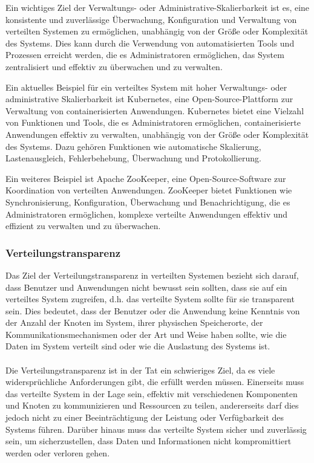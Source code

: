 \begin{itemize}
Ein wichtiges Ziel der Verwaltungs- oder Administrative-Skalierbarkeit ist es, eine konsistente und zuverlässige Überwachung, Konfiguration und Verwaltung von verteilten Systemen zu ermöglichen, unabhängig von der Größe oder Komplexität des Systems. Dies kann durch die Verwendung von automatisierten Tools und Prozessen erreicht werden, die es Administratoren ermöglichen, das System zentralisiert und effektiv zu überwachen und zu verwalten.

Ein aktuelles Beispiel für ein verteiltes System mit hoher Verwaltungs- oder administrative Skalierbarkeit ist Kubernetes, eine Open-Source-Plattform zur Verwaltung von containerisierten Anwendungen. Kubernetes bietet eine Vielzahl von Funktionen und Tools, die es Administratoren ermöglichen, containerisierte Anwendungen effektiv zu verwalten, unabhängig von der Größe oder Komplexität des Systems. Dazu gehören Funktionen wie automatische Skalierung, Lastenausgleich, Fehlerbehebung, Überwachung und Protokollierung.

Ein weiteres Beispiel ist Apache ZooKeeper, eine Open-Source-Software zur Koordination von verteilten Anwendungen. ZooKeeper bietet Funktionen wie Synchronisierung, Konfiguration, Überwachung und Benachrichtigung, die es Administratoren ermöglichen, komplexe verteilte Anwendungen effektiv und effizient zu verwalten und zu überwachen.
\end{itemize}

\subsubsection{Verteilungstransparenz}

Das Ziel der Verteilungstransparenz in verteilten Systemen bezieht sich darauf, dass Benutzer und Anwendungen nicht bewusst sein sollten, dass sie auf ein verteiltes System zugreifen, d.h. das verteilte System sollte für sie transparent sein. Dies bedeutet, dass der Benutzer oder die Anwendung keine Kenntnis von der Anzahl der Knoten im System, ihrer physischen Speicherorte, der Kommunikationsmechanismen oder der Art und Weise haben sollte, wie die Daten im System verteilt sind oder wie die Auslastung des Systems ist.
\\\\
Die Verteilungstransparenz ist in der Tat ein schwieriges Ziel, da es viele widersprüchliche Anforderungen gibt, die erfüllt werden müssen. Einerseits muss das verteilte System in der Lage sein, effektiv mit verschiedenen Komponenten und Knoten zu kommunizieren und Ressourcen zu teilen, andererseits darf dies jedoch nicht zu einer Beeinträchtigung der Leistung oder Verfügbarkeit des Systems führen. Darüber hinaus muss das verteilte System sicher und zuverlässig sein, um sicherzustellen, dass Daten und Informationen nicht kompromittiert werden oder verloren gehen.

